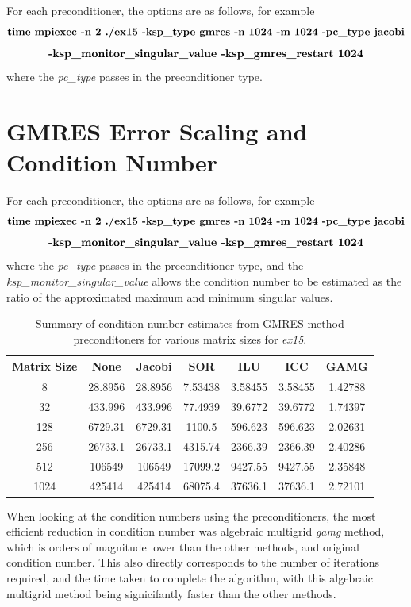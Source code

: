 \documentclass[12pt,letterpaper]{article}
\newcommand{\cmd}[1]{$$\textrm{\textbf{#1}}$$}
\newcommand{\program}{\textit{ex15}}
\begin{document}
For each preconditioner, the options are as follows, for example \cmd{time mpiexec -n 2 ./ex15 -ksp\_type gmres -n 1024 -m 1024 -pc\_type jacobi} \cmd{-ksp\_monitor\_singular\_value  -ksp\_gmres\_restart 1024}
where the \textit{pc\_type} passes in the preconditioner type.



\section{GMRES Error Scaling and Condition Number}

For each preconditioner, the options are as follows, for example \cmd{time mpiexec -n 2 ./ex15 -ksp\_type gmres -n 1024 -m 1024 -pc\_type jacobi} \cmd{-ksp\_monitor\_singular\_value -ksp\_gmres\_restart 1024}
where the \textit{pc\_type} passes in the preconditioner type, and the \textit{ksp\_monitor\_singular\_value} allows the condition number to be estimated as the ratio of the approximated maximum and minimum singular values.

\begin{table}[htb!]
    \centering
    \caption{Summary of condition number estimates from GMRES method preconditoners for various matrix sizes for \program.}
    \label{tab:Ex3b_gmres}
    \begin{tabular}{|c|c|c|c|c|c|c|} \hline
        Matrix Size & None & Jacobi & SOR & ILU & ICC & GAMG \\ \hline
        8   &   28.8956    &  28.8956 &  7.53438  & 3.58455  & 3.58455  &  1.42788 \\ \hline
        32  &    433.996   &  433.996 &  77.4939  & 39.6772 &  39.6772  &  1.74397 \\ \hline
        128 &    6729.31   &  6729.31  &  1100.5  & 596.623  & 596.623  &  2.02631 \\ \hline
        256 &    26733.1   &   26733.1 &  4315.74 &  2366.39  & 2366.39 &   2.40286 \\ \hline
        512 &   106549     &  106549  & 17099.2  & 9427.55 &  9427.55  &  2.35848 \\ \hline
        1024 &   425414    &   425414 &  68075.4 &  37636.1  & 37636.1 &   2.72101 \\ \hline
    \end{tabular}
\end{table}


When looking at the condition numbers using the preconditioners, the most efficient reduction in condition number was algebraic multigrid \textit{gamg} method, which is orders of magnitude lower than the other methods, and original condition number. This also directly corresponds to the number of iterations required, and the time taken to complete the algorithm, with this algebraic multigrid method being signicifantly faster than the other methods.
\end{document}
